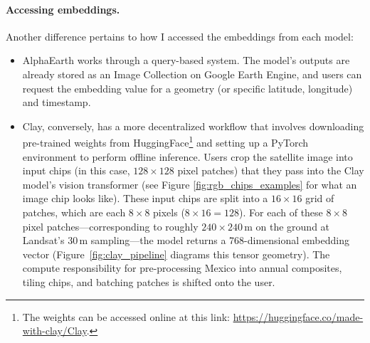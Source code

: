 \documentclass[12pt,letterpaper]{article}
\begin{document}
\paragraph{Accessing embeddings.}
Another difference pertains to how I accessed the embeddings from each model:
\begin{itemize}
  \item AlphaEarth works through a query-based system. The model's outputs are already stored as an Image Collection on Google Earth Engine, and users can request the embedding value for a geometry (or specific latitude, longitude) and timestamp.

  \item Clay, conversely, has a more decentralized workflow that involves downloading pre-trained weights from HuggingFace\footnote{The weights can be accessed online at this link: \url{https://huggingface.co/made-with-clay/Clay}.} and setting up a PyTorch environment to perform offline inference. Users crop the satellite image into input chips (in this case, $128 \times 128$ pixel patches) that they pass into the Clay model's vision transformer (see Figure \ref{fig:rgb_chips_examples} for what an image chip looks like). These input chips are split into a $16 \times 16$ grid of patches, which are each $8\times 8$ pixels ($8 \times 16 = 128$). For each of these $8 \times 8$ pixel patches---corresponding to roughly $240\times 240$\,m on the ground at Landsat's 30\,m sampling---the model returns a 768-dimensional embedding vector (Figure~\ref{fig:clay_pipeline} diagrams this tensor geometry). The compute responsibility for pre-processing Mexico into annual composites, tiling chips, and batching patches is shifted onto the user.
\end{itemize}
\end{document}
